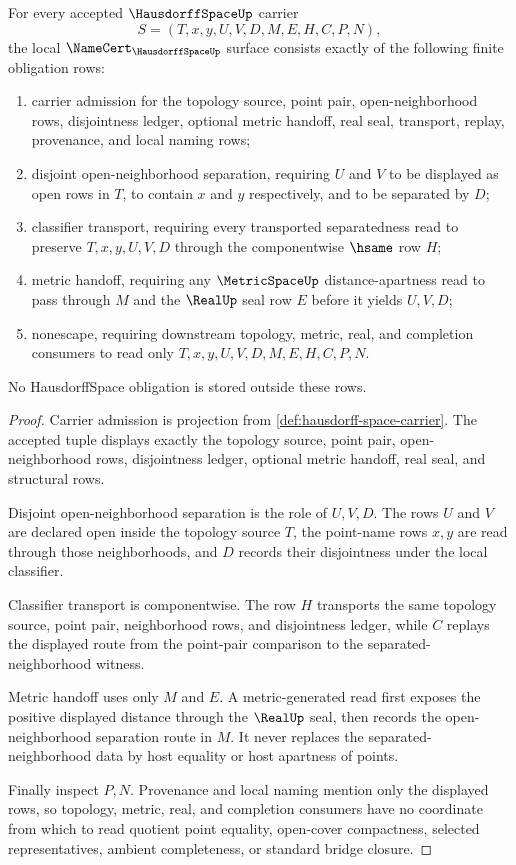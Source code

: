 \begin{theorem}
\label{thm:hausdorff-space-namecert-obligations}
For every accepted $\HausdorffSpaceUp$ carrier
$$
S=(T,x,y,U,V,D,M,E,H,C,P,N),
$$
the local $\NameCert_{\HausdorffSpaceUp}$ surface consists exactly of the following finite obligation rows:
\begin{enumerate}
\item carrier admission for the topology source, point pair, open-neighborhood rows, disjointness ledger, optional metric handoff, real seal, transport, replay, provenance, and local naming rows;
\item disjoint open-neighborhood separation, requiring $U$ and $V$ to be displayed as open rows in $T$, to contain $x$ and $y$ respectively, and to be separated by $D$;
\item classifier transport, requiring every transported separatedness read to preserve $T,x,y,U,V,D$ through the componentwise $\hsame$ row $H$;
\item metric handoff, requiring any $\MetricSpaceUp$ distance-apartness read to pass through $M$ and the $\RealUp$ seal row $E$ before it yields $U,V,D$;
\item nonescape, requiring downstream topology, metric, real, and completion consumers to read only $T,x,y,U,V,D,M,E,H,C,P,N$.
\end{enumerate}
No HausdorffSpace obligation is stored outside these rows.
\end{theorem}
\begin{proof}
Carrier admission is projection from \autoref{def:hausdorff-space-carrier}. The accepted tuple displays exactly the topology source, point pair, open-neighborhood rows, disjointness ledger, optional metric handoff, real seal, and structural rows.

Disjoint open-neighborhood separation is the role of $U,V,D$. The rows $U$ and $V$ are declared open inside the topology source $T$, the point-name rows $x,y$ are read through those neighborhoods, and $D$ records their disjointness under the local classifier.

Classifier transport is componentwise. The row $H$ transports the same topology source, point pair, neighborhood rows, and disjointness ledger, while $C$ replays the displayed route from the point-pair comparison to the separated-neighborhood witness.

Metric handoff uses only $M$ and $E$. A metric-generated read first exposes the positive displayed distance through the $\RealUp$ seal, then records the open-neighborhood separation route in $M$. It never replaces the separated-neighborhood data by host equality or host apartness of points.

Finally inspect $P,N$. Provenance and local naming mention only the displayed rows, so topology, metric, real, and completion consumers have no coordinate from which to read quotient point equality, open-cover compactness, selected representatives, ambient completeness, or standard bridge closure.
\end{proof}

